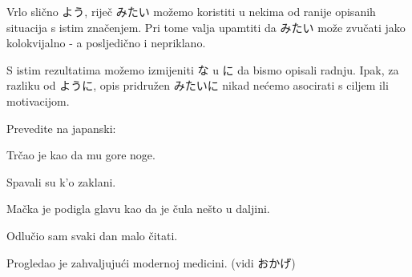 	
	Vrlo slično よう, riječ みたい možemo koristiti u nekima od ranije opisanih situacija s istim značenjem. Pri tome valja upamtiti da みたい može zvučati jako kolokvijalno - a posljedično i nepriklano.
	
	\begin{reibun}
	\end{reibun}

	
	S istim rezultatima možemo izmijeniti な u に da bismo opisali radnju. Ipak, za razliku od ように, opis pridružen みたいに nikad nećemo asocirati s ciljem ili motivacijom.
	
	\newpage
	
	\begin{mondai}{Prevedite na japanski:}
		\item Trčao je kao da mu gore noge.
		\item Spavali su k'o zaklani.
		\item Mačka je podigla glavu kao da je čula nešto u daljini.
		\item Odlučio sam svaki dan malo čitati.
		\item Progledao je zahvaljujući modernoj medicini. (vidi おかげ)
	\end{mondai}

